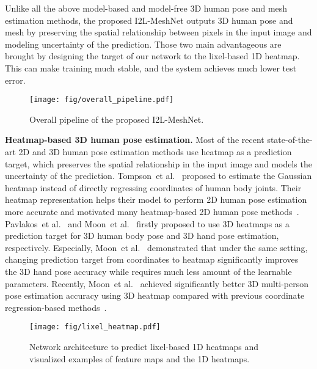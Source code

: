 \documentclass[runningheads]{llncs}
\begin{document}
Unlike all the above model-based and model-free 3D human pose and mesh estimation methods, the proposed I2L-MeshNet outputs 3D human pose and mesh by preserving the spatial relationship between pixels in the input image and modeling uncertainty of the prediction.
Those two main advantageous are brought by designing the target of our network to the lixel-based 1D heatmap.
This can make training much stable, and the system achieves much lower test error. 

\begin{figure}[t]
\begin{center}
\texttt{[image: fig/overall\_pipeline.pdf]}
\end{center}
   \caption{
   Overall pipeline of the proposed I2L-MeshNet. 
   }
\label{fig:overall_pipeline}
\end{figure}


\noindent \textbf{Heatmap-based 3D human pose estimation.}
Most of the recent state-of-the-art 2D and 3D human pose estimation methods use heatmap as a prediction target, which preserves the spatial relationship in the input image and models the uncertainty of the prediction. 
Tompson~et al.~\cite{tompson2014joint} proposed to estimate the Gaussian heatmap instead of directly regressing coordinates of human body joints. 
Their heatmap representation helps their model to perform 2D human pose estimation more accurate and motivated many heatmap-based 2D human pose methods~\cite{newell2016stacked,chen2018cascaded,xiao2018simple}. 
Pavlakos~et al.~\cite{pavlakos2017coarse} and Moon~et al.~\cite{moon2018v2v} firstly proposed to use 3D heatmaps as a prediction target for 3D human body pose and 3D hand pose estimation, respectively. 
Especially, Moon~et al.~\cite{moon2018v2v} demonstrated that under the same setting, changing prediction target from coordinates to heatmap significantly improves the 3D hand pose accuracy while requires much less amount of the learnable parameters.
Recently, Moon~et al.~\cite{moon2019camera} achieved significantly better 3D multi-person pose estimation accuracy using 3D heatmap compared with previous coordinate regression-based methods~\cite{rogez2017lcr}.


 

\begin{figure}[t]
\begin{center}
\texttt{[image: fig/lixel\_heatmap.pdf]}
\end{center}
   \caption{
   Network architecture to predict lixel-based 1D heatmaps and visualized examples of feature maps and the 1D heatmaps.
   }
\label{fig:lixel_1d_heatmap}
\end{figure}
\end{document}
